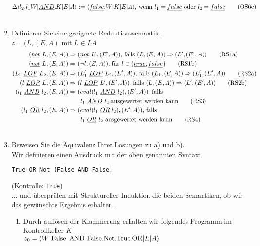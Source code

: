 \documentclass[ngerman,a4paper]{report}
\begin{document}
\begin{enumerate}
\begin{align}
\Delta\langle l_2.l_1W|\underline{AND}.K|E|A\rangle &:= \langle \underline{false}.W|K|E|A\rangle\text{, wenn }l_1=\underline{false}\text{ oder }l_2=\underline{false}\tag{OS6c}\\\notag
\end{align}
\item Definieren Sie eine geeignete Reduktionssemantik.\\
$z=(L, (E,A)$ mit $L \in LA$
\begin{align}
(\underline{not}\  L,(E,A)) &\Rightarrow (\underline{not}\  L',(E',A))\text{, falls }(L,(E,A)) \Rightarrow (L',(E',A))\tag{RS1a}\\
(\underline{not}\  L,(E,A)) &\Rightarrow (\neg l,(E,A))\text{, für }l\in\{\underline{true},\underline{false}\}\tag{RS1b}\\
(L_1\ \underline{LOP}\ L_2,(E,A)) &\Rightarrow (L_1'\ \underline{LOP}\ L_2,(E',A))\text{, falls }(L_1,(E,A)) \Rightarrow (L_1',(E',A))\tag{RS2a}\\
(l\ \underline{LOP}\ L,(E,A)) &\Rightarrow (l\ \underline{LOP}\ L',(E',A))\text{, falls }(L,(E,A)) \Rightarrow (L',(E',A))\tag{RS2b}\\
(l_1\ \underline{AND}\ l_2,(E,A)) &\Rightarrow (eval(l_1\ \underline{AND}\ l_2),(E',A))\text{, falls }\notag\\&\quad\quad l_1\ \underline{AND}\ l_2\text{ ausgewertet werden kann}\tag{RS3}\\
(l_1\ \underline{OR}\ l_2,(E,A)) &\Rightarrow (eval(l_1\ \underline{OR}\ l_2),(E',A))\text{, falls }\notag\\&\quad\quad l_1\ \underline{OR}\ l_2\text{ ausgewertet werden kann}\tag{RS4}\\ \notag
\end{align}
\item Beweisen Sie die Äquivalenz Ihrer Lösungen zu a) und b).\\
Wir definieren einen Ausdruck mit der oben genannten Syntax:
\begin{lstlisting}
True OR Not (False AND False)
\end{lstlisting}
(Kontrolle: \lstinline!True!)\\
... und überprüfen mit Struktureller Induktion die beiden Semantiken, ob wir das gewünschte Ergebnis erhalten.
\begin{enumerate}
\item Durch auflösen der Klammerung erhalten wir folgendes Programm im Kontrollkeller $K$\\
$z_0=\langle W|\text{\lstinline!False AND False.Not.True.OR!}|E|A\rangle$

\end{enumerate}
\end{enumerate}
\end{document}
